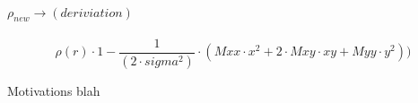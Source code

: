\paragraph{\( \rho_{new} \rightarrow (deriviation) \) }

\begin{equation}
  \rho(r) \cdot 1-\frac{1}{(2 \cdot sigma^{2} )} \cdot
  ( Mxx \cdot x^{2} + 2 \cdot Mxy \cdot xy + Myy \cdot y^{2} ))
\end{equation}

%
%

Motivations blah
